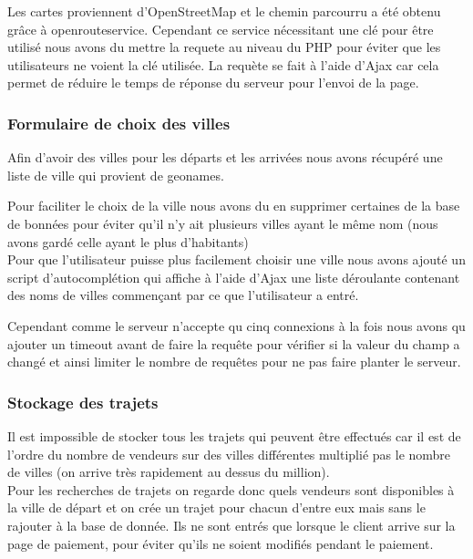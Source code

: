 \documentclass{article}
\begin{document}
            Les cartes proviennent d'OpenStreetMap et le chemin parcourru a été obtenu grâce à openrouteservice. Cependant ce service nécessitant une clé pour être utilisé nous avons du mettre la requete au niveau du PHP pour éviter que les utilisateurs ne voient la clé utilisée.
            La requète se fait à l'aide d'Ajax car cela permet de réduire le temps de réponse du serveur pour l'envoi de la page.
        
        \subsubsection{Formulaire de choix des villes}
            Afin d'avoir des villes pour les départs et les arrivées nous avons récupéré une liste de ville qui provient de geonames.
            
            Pour faciliter le choix de la ville nous avons du en supprimer certaines de la base de bonnées pour éviter qu'il n'y ait plusieurs villes ayant le même nom (nous avons gardé celle ayant le plus d'habitants)
            \\
            
            Pour que l'utilisateur puisse plus facilement choisir une ville nous avons ajouté un script d'autocomplétion qui affiche à l'aide d'Ajax une liste déroulante contenant des noms de villes commençant par ce que l'utilisateur a entré.
            
            Cependant comme le serveur n'accepte qu cinq connexions à la fois nous avons qu ajouter un timeout avant de faire la requête pour vérifier si la valeur du champ a changé et ainsi limiter le nombre de requêtes pour ne pas faire planter le serveur.
        
        \subsubsection{Stockage des trajets}
            Il est impossible de stocker tous les trajets qui peuvent être effectués car il est de l'ordre du nombre de vendeurs sur des villes différentes multiplié pas le nombre de villes (on arrive très rapidement au dessus du million). 
            \\
            
            Pour les recherches de trajets on regarde donc quels vendeurs sont disponibles à la ville de départ et on crée un trajet pour chacun d'entre eux mais sans le rajouter à la base de donnée. Ils ne sont entrés que lorsque le client arrive sur la page de paiement, pour éviter qu'ils ne soient modifiés pendant le paiement.
        
\end{document}
